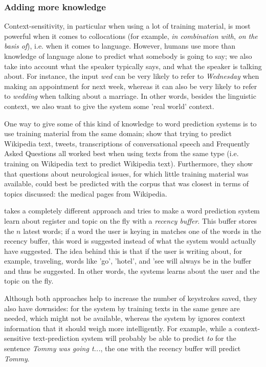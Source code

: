 \documentclass[12pt]{article}
\begin{document}
\subsubsection{Adding more knowledge} \label{more_knowledge}

Context-sensitivity, in particular when using a lot of training material, is most powerful when it comes to collocations (for example, \emph{in combination with}, \emph{on the basis of}), i.e. when it comes to language. However, humans use more than knowledge of language alone to predict what somebody is going to say; we also take into account what the speaker typically says, and what the speaker is talking about. For instance, the input \emph{wed} can be very likely to refer to \emph{Wednesday} when making an appointment for next week, whereas it can also be very likely to refer to \emph{wedding} when talking about a marriage. In other words, besides the linguistic context, we also want to give the system some 'real world' context.

One way to give some of this kind of knowledge to word prediction systems is to use training material from the same domain;  show that trying to predict Wikipedia text, tweets, transcriptions of conversational speech and Frequently Asked Questions all worked best when using texts from the same type (i.e. training on Wikipedia text to predict Wikipedia text). Furthermore, they show that questions about neurological issues, for which little training material was available, could best be predicted with the corpus that was closest in terms of topics discussed: the medical pages from Wikipedia. 

 takes a completely different approach and tries to make a word prediction system learn about register and topic on the fly with a \emph{recency buffer}. This buffer stores the $n$ latest words; if a word the user is keying in matches one of the words in the recency buffer, this word is suggested instead of what the system would actually have suggested. The idea behind this is that if the user is writing about, for example, traveling, words like 'go', 'hotel', and 'see  will always be in the buffer and thus be suggested. In other words, the systems learns about the user and the topic on the fly.

Although both approaches help to increase the number of keystrokes saved, they also have downsides: for the system by  training texts in the same genre are needed, which might not be available, whereas the system by  ignores context information that it should weigh more intelligently. For example, while a context-sensitive text-prediction system will probably be able to predict \emph{to} for the sentence \emph{Tommy was going t...}, the one with the recency buffer will predict \emph{Tommy}.
\end{document}
